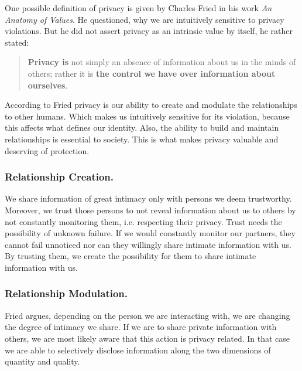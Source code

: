\documentclass[runningheads,a4paper]{llncs}
\begin{document}
One possible definition of privacy is given by Charles Fried in his work \textit{An Anatomy of Values}\cite{CFried:Privacy}.
He questioned, why we are intuitively sensitive to privacy violations.
But he did not assert privacy as an intrinsic value by itself, he rather stated:
\begin{quote}
\textbf{Privacy is} not simply an absence of information about us in the minds of others;
rather it is \textbf{the control we have over information about ourselves}. \cite{CFried:Privacy}
\end{quote}
According to Fried privacy is our ability to create and modulate the relationships to other humans.
Which makes us intuitively sensitive for its violation, because this affects what defines our identity.
Also, the ability to build and maintain relationships is essential to society.
This is what makes privacy valuable and deserving of protection. 
\cite{sep-privacy}\cite{CFried:Privacy}

\subsubsection{Relationship Creation.}


We share information of great intimacy only with persons we deem trustworthy. 
Moreover, we trust those persons to not reveal information about us to others by not constantly monitoring them, i.e. respecting their privacy.
Trust needs the possibility of unknown failure.
If we would constantly monitor our partners, they cannot fail unnoticed nor can they willingly share intimate information with us.
By trusting them, we create the possibility for them to share intimate information with us.
\cite{CFried:Privacy}

\subsubsection{Relationship Modulation.}
Fried argues, depending on the person we are interacting with, we are changing the degree of intimacy we share.
If we are to share private information with others, we are most likely aware that this action is privacy related.
In that case we are able to selectively disclose information along the two dimensions of quantity and quality.
\cite{CFried:Privacy}
\end{document}
